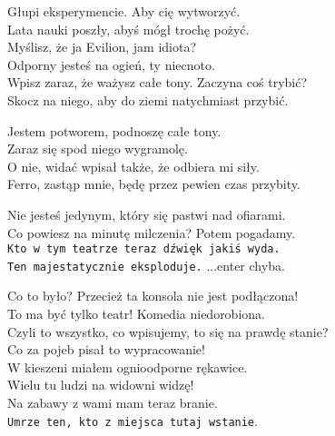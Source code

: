 \chardokt{}
Głupi eksperymencie. Aby cię wytworzyć.\\
Lata nauki poszły, abyś mógł trochę pożyć.\\
Myślisz, że ja Evilion, jam idiota?\\
Odporny jesteś na ogień, ty niecnoto.\\
Wpisz zaraz, że ważysz całe tony. Zaczyna coś trybić?\\
Skocz na niego, aby do ziemi natychmiast przybić.\\


\charmik{}
Jestem potworem, podnoszę całe tony.\\
Zaraz się spod niego wygramolę.\\
O nie, widać wpisał także, że odbiera mi siły.\\
Ferro, zastąp mnie, będę przez pewien czas przybity.\\


\charfer{}
Nie jesteś jedynym, który się pastwi nad ofiarami.\\
Co powiesz na minutę milczenia? Potem pogadamy.\\
\texttt{Kto w tym teatrze teraz dźwięk jakiś wyda.\\
Ten majestatycznie eksploduje.} ...enter chyba.\\


\charfer{}
Co to było? Przecież ta konsola nie jest podłączona!\\
To ma być tylko teatr! Komedia niedorobiona.\\
Czyli to wszystko, co wpisujemy, to się na prawdę stanie?\\
Co za pojeb pisał to wypracowanie!\\

\chardokt{}
W kieszeni miałem ognioodporne rękawice.\\
Wielu tu ludzi na widowni widzę!\\
Na zabawy z wami mam teraz branie.\\
\texttt{Umrze ten, kto z miejsca tutaj wstanie}.\\









